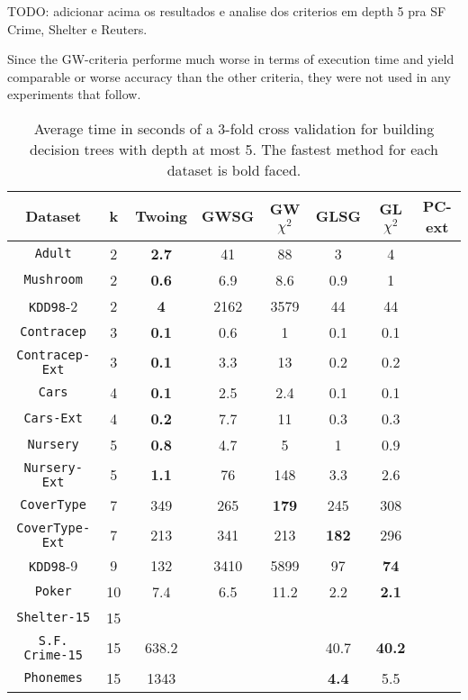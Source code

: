TODO: adicionar acima os resultados e analise dos criterios em depth 5 pra SF Crime, Shelter e Reuters.

Since the GW-criteria performe much worse in terms of execution time and yield comparable or worse accuracy than the other criteria, they were not used in any experiments that follow.

\begin{table*}[]
\small
\centering
\caption{Average time in seconds of a 3-fold cross validation
for building decision trees with depth at most 5.
The fastest method for each dataset is bold faced.}
\begin{tabular}{c|c|c|c|c|c|c|c}
Dataset             & k  & Twoing    & GWSG  & GW$\chi^2$ & GLSG      & GL$\chi^2$ & PC-ext     \\ \hline
{\tt Adult}         & 2  & {\bf  2.7} & 41   & 88         & 3         & 4 &  \\
{\tt Mushroom}      & 2  & {\bf 0.6} & 6.9  & 8.6         & 0.9       & 1  & \\
{\tt KDD98}-2       & 2  & {\bf 4}   & 2162 & 3579        & 44        & 44 & \\
{\tt Contracep}     & 3  & {\bf 0.1} & 0.6  & 1           & 0.1       & 0.1& \\
{\tt Contracep-Ext} & 3  & {\bf 0.1} & 3.3  & 13          & 0.2       & 0.2& \\
{\tt Cars}          & 4  & {\bf 0.1} & 2.5  & 2.4         & 0.1       & 0.1& \\
{\tt Cars-Ext}      & 4  & {\bf 0.2} & 7.7  & 11          & 0.3       & 0.3& \\
{\tt Nursery}       & 5  & {\bf 0.8} & 4.7  & 5           & 1         & 0.9& \\
{\tt Nursery-Ext}   & 5  & {\bf 1.1} & 76   & 148         & 3.3       & 2.6 &  \\
{\tt CoverType}     & 7  & 349       & 265  & {\bf 179}   & 245       & 308& \\
{\tt CoverType-Ext} & 7  & 213       & 341  & 213         & {\bf 182} & 296& \\
{\tt KDD98}-9       & 9  & 132       & 3410 & 5899        & 97        & {\bf 74} & \\ 
{\tt Poker}         & 10 & 7.4       & 6.5  & 11.2        & 2.2       & {\bf 2.1}&\\
{\tt Shelter-15}    & 15 &           &      &             &           & &        \\   
{\tt S.F. Crime-15} & 15 & 638.2     &      &             & 40.7      & {\bf 40.2} &       \\ 
{\tt Phonemes}      & 15 & 1343      &      &             & {\bf 4.4} & 5.5 &       
\end{tabular}
\label{tab:time}
\end{table*}



